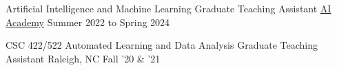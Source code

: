


\begin{cvhonors}

  \cvhonor
    {Artificial Intelligence and Machine Learning} %
    {Graduate Teaching Assistant} %
    {\href{https://ai-academy.ncsu.edu/}{AI Academy}} %
    {\footnotesize Summer 2022 to Spring 2024} %

    





  \cvhonor
    {CSC 422/522 Automated Learning and Data Analysis} %
    {Graduate Teaching Assistant} %
    {Raleigh, NC} %
    {\footnotesize Fall '20 \& '21} %


\end{cvhonors}

